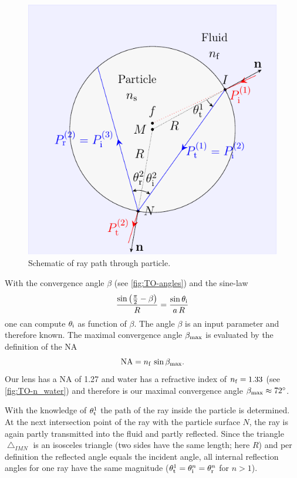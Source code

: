 \begin{figure}[thp]
  \centering
  \includegraphics[]{Plots/cache/ray.pdf}
  \caption{Schematic of ray path through particle.}
  \label{fig:TO-ray_particle}
\end{figure}

With the convergence angle $\beta$ (see \cref{fig:TO-angles}) and the sine-law
\begin{equation}
  \frac{\sin\left( \frac{\pi}{2}-\beta \right)}{R} = 
  \frac{\sin\theta_{\mathrm{i}}}{a\,R}
  \label{eq:TO-sine-law}
\end{equation}
one can compute $\theta_{\mathrm{i}}$ as function of $\beta$. The angle $\beta$ is an 
input parameter and therefore known. The maximal convergence angle 
$\beta_{\mathrm{max}}$ is evaluated by the definition of the NA
\begin{equation}
  \text{NA} = n_{\mathrm{f}}\,\sin\beta_{\mathrm{max}}.
  \label{eq:TO-NA}
\end{equation}
Our lens has a NA of 1.27 and water has a refractive index of $n_{\mathrm{f}}=1.33$ (see 
\cref{fig:TO-n_water}) and therefore is our maximal convergence angle 
$\beta_{\mathrm{max}} \approx \SI{72}{\degree}$.

With the knowledge of $\theta_{\mathrm{t}}^{1}$ the path of the ray inside the 
particle is determined. At the next intersection point of the ray with the 
particle surface $N$, the ray is again partly transmitted into the fluid and 
partly reflected. Since the triangle $\bigtriangleup_{IMN}$ is an isosceles 
triangle (two sides have the same length; here $R$) and per definition the 
reflected angle equals the incident angle, all internal reflection angles for 
one ray have the same magnitude 
($\theta_{\mathrm{t}}^{1}=\theta_{\mathrm{i}}^{n}=\theta_{\mathrm{r}}^{n}$ for $n>1$).

